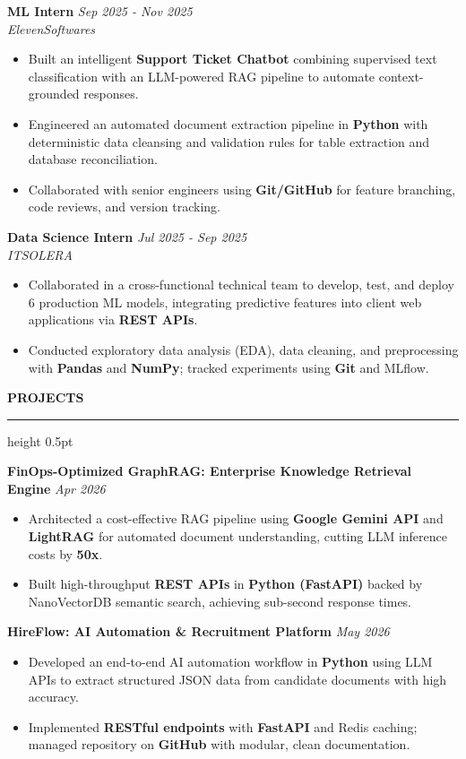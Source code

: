 \documentclass[10pt,letterpaper]{article}
\newcommand{\resumesection}[1]{%
  \vspace{4pt}%
  {\fontsize{10.5pt}{12pt}\selectfont\textbf{\MakeUppercase{#1}}}%
  \vspace{1.5pt}%
  \hrule height 0.5pt%
  \vspace{3pt}%
}
\begin{document}
\vspace{2pt}
\noindent\textbf{ML Intern} \hfill \textit{Sep 2025 - Nov 2025} \\
\textit{ElevenSoftwares}
\begin{itemize}
  \item Built an intelligent \textbf{Support Ticket Chatbot} combining supervised text classification with an LLM-powered RAG pipeline to automate context-grounded responses.
  \item Engineered an automated document extraction pipeline in \textbf{Python} with deterministic data cleansing and validation rules for table extraction and database reconciliation.
  \item Collaborated with senior engineers using \textbf{Git/GitHub} for feature branching, code reviews, and version tracking.
\end{itemize}

\vspace{2pt}
\noindent\textbf{Data Science Intern} \hfill \textit{Jul 2025 - Sep 2025} \\
\textit{ITSOLERA}
\begin{itemize}
  \item Collaborated in a cross-functional technical team to develop, test, and deploy 6 production ML models, integrating predictive features into client web applications via \textbf{REST APIs}.
  \item Conducted exploratory data analysis (EDA), data cleaning, and preprocessing with \textbf{Pandas} and \textbf{NumPy}; tracked experiments using \textbf{Git} and MLflow.
\end{itemize}

\resumesection{Projects}
\noindent\textbf{FinOps-Optimized GraphRAG: Enterprise Knowledge Retrieval Engine} \hfill \textit{Apr 2026}
\begin{itemize}
  \item Architected a cost-effective RAG pipeline using \textbf{Google Gemini API} and \textbf{LightRAG} for automated document understanding, cutting LLM inference costs by \textbf{50x}.
  \item Built high-throughput \textbf{REST APIs} in \textbf{Python (FastAPI)} backed by NanoVectorDB semantic search, achieving sub-second response times.
\end{itemize}

\vspace{2pt}
\noindent\textbf{HireFlow: AI Automation \& Recruitment Platform} \hfill \textit{May 2026}
\begin{itemize}
  \item Developed an end-to-end AI automation workflow in \textbf{Python} using LLM APIs to extract structured JSON data from candidate documents with high accuracy.
  \item Implemented \textbf{RESTful endpoints} with \textbf{FastAPI} and Redis caching; managed repository on \textbf{GitHub} with modular, clean documentation.
\end{itemize}
\end{document}
